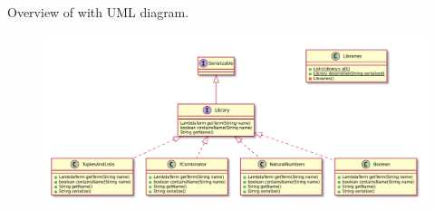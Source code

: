 Overview of \texttt{\pkg} with UML diagram.

\begin{figure}[H]
	\centering
	\includegraphics[width=\textwidth]{packageDiagrams/libraryPackage}
\end{figure}